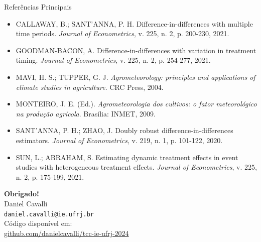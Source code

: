 \documentclass[10pt,aspectratio=169]{beamer}
\begin{document}
\begin{frame}[allowframebreaks]{Referências Principais}
\footnotesize
\begin{itemize}
    \item CALLAWAY, B.; SANT'ANNA, P. H. Difference-in-differences with multiple time periods. \textit{Journal of Econometrics}, v. 225, n. 2, p. 200-230, 2021.
    
    \item GOODMAN-BACON, A. Difference-in-differences with variation in treatment timing. \textit{Journal of Econometrics}, v. 225, n. 2, p. 254-277, 2021.
    
    \item MAVI, H. S.; TUPPER, G. J. \textit{Agrometeorology: principles and applications of climate studies in agriculture}. CRC Press, 2004.
    
    \item MONTEIRO, J. E. (Ed.). \textit{Agrometeorologia dos cultivos: o fator meteorológico na produção agrícola}. Brasília: INMET, 2009.
    
    \item SANT'ANNA, P. H.; ZHAO, J. Doubly robust difference-in-differences estimators. \textit{Journal of Econometrics}, v. 219, n. 1, p. 101-122, 2020.
    
    \item SUN, L.; ABRAHAM, S. Estimating dynamic treatment effects in event studies with heterogeneous treatment effects. \textit{Journal of Econometrics}, v. 225, n. 2, p. 175-199, 2021.
\end{itemize}
\end{frame}

\begin{frame}[plain]
\vspace{5cm}
\centering
\Large
\textbf{Obrigado!}\\
\vspace{1cm}
\normalsize
Daniel Cavalli\\
\texttt{daniel.cavalli@ie.ufrj.br}\\
\vspace{0.5cm}
Código disponível em:\\
\url{github.com/danielcavalli/tcc-ie-ufrj-2024}
\end{frame}
\end{document}
